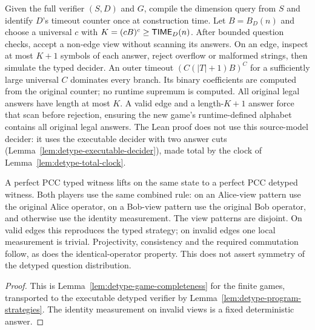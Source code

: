 \begin{lemma}
\label{lem:detype-decider}
Given the full verifier $(S,D)$ and $G$, compile the dimension query from
$S$ and identify $D$'s timeout counter once at construction time.
Let $B=B_D(n)$ and choose a universal $c$ with $K=(cB)^c\geq\mathsf{TIME}_D(n)$.
After bounded question checks, accept a non-edge view without scanning its
answers. On an edge, inspect at most $K+1$ symbols of each answer, reject
overflow or malformed strings, then simulate the typed decider.
An outer timeout $(C(|T|+1)B)^C$ for a sufficiently large universal $C$
dominates every branch. Its binary coefficients are computed from the
original counter; no runtime supremum is computed.
All original legal answers have length at most $K$. A valid edge and a
length-$K+1$ answer force that scan before rejection, ensuring the new game's
runtime-defined alphabet contains all original legal answers.
The Lean proof does not use this source-model decider: it uses the executable decider with
two answer cuts (Lemma~\ref{lem:detype-executable-decider}), made total by the clock of
Lemma~\ref{lem:detype-total-clock}.
\end{lemma}

\begin{lemma}
\label{lem:detype-completeness}
\leanok
A perfect PCC typed witness lifts on the same state to a perfect PCC detyped
witness. Both players use the same combined rule: on an Alice-view pattern
use the original Alice operator, on a Bob-view pattern use the original Bob
operator, and otherwise use the identity measurement. The view patterns are
disjoint. On valid edges this reproduces the typed strategy; on invalid
edges one local measurement is trivial. Projectivity, consistency and the
required commutation follow, as does the identical-operator property.
This does not assert symmetry of the detyped question distribution.
\end{lemma}
\begin{proof}
\leanok
This is Lemma~\ref{lem:detype-game-completeness} for the finite games, transported to the
executable detyped verifier by Lemma~\ref{lem:detype-program-strategies}. The identity
measurement on invalid views is a fixed deterministic answer.
\end{proof}


